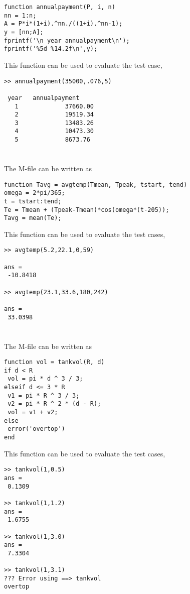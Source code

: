 \documentclass[../main.tex]{subfiles}
\begin{document}
\begin{lstlisting}[numbers=none]
function annualpayment(P, i, n)
nn = 1:n;
A = P*i*(1+i).^nn./((1+i).^nn-1);
y = [nn;A];
fprintf('\n year annualpayment\n');
fprintf('%5d %14.2f\n',y);
\end{lstlisting}
\bigbreak
This function can be used to evaluate the test case, 
\bigbreak
\begin{lstlisting}[numbers=none]
>> annualpayment(35000,.076,5)

 year 	annualpayment
   1 			 37660.00
   2 			 19519.34
   3 			 13483.26
   4 			 10473.30
   5 			 8673.76 
\end{lstlisting}
\bigbreak
\section{}
The M-file can be written as
\bigbreak
\begin{lstlisting}[numbers=none]
function Tavg = avgtemp(Tmean, Tpeak, tstart, tend)
omega = 2*pi/365;
t = tstart:tend;
Te = Tmean + (Tpeak-Tmean)*cos(omega*(t-205));
Tavg = mean(Te);
\end{lstlisting}
\bigbreak
This function can be used to evaluate the test cases,
\bigbreak
\begin{lstlisting}[numbers=none]
>> avgtemp(5.2,22.1,0,59)

ans =
 -10.8418

>> avgtemp(23.1,33.6,180,242)

ans =
 33.0398 
\end{lstlisting}
\bigbreak
\section{}
The M-file can be written as
\bigbreak
\begin{lstlisting}[numbers=none]
function vol = tankvol(R, d)
if d < R
 vol = pi * d ^ 3 / 3;
elseif d <= 3 * R
 v1 = pi * R ^ 3 / 3;
 v2 = pi * R ^ 2 * (d - R);
 vol = v1 + v2;
else
 error('overtop')
end 
\end{lstlisting}\bigbreak
This function can be used to evaluate the test cases, 
\bigbreak
\begin{lstlisting}[numbers=none]
>> tankvol(1,0.5)
ans =
 0.1309

>> tankvol(1,1.2)
ans =
 1.6755

>> tankvol(1,3.0)
ans =
 7.3304

>> tankvol(1,3.1)
??? Error using ==> tankvol
overtop
\end{lstlisting}
\bigbreak
\end{document}
